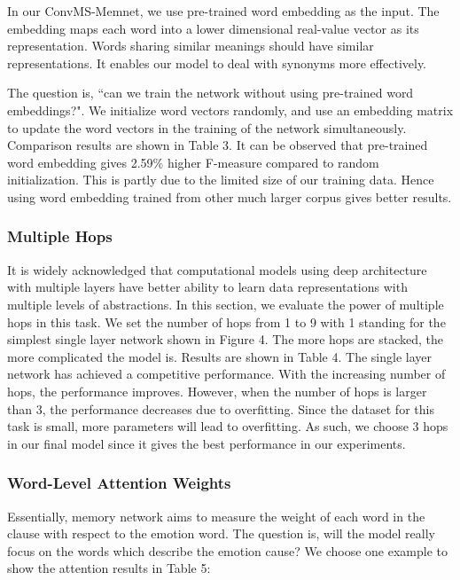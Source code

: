 \documentclass[11pt,letterpaper]{article}
\begin{document}
\begin{CJK*}{UTF8}{gbsn}
In our ConvMS-Memnet, we use pre-trained word embedding as the input. The embedding maps each word into a lower dimensional real-value vector as its representation. Words sharing similar meanings should have similar representations. It enables our model to deal with synonyms more effectively. 

The question is, ``can we train the network without using pre-trained word embeddings?". We initialize word vectors randomly, and use an embedding matrix to update the word vectors in the training of the network simultaneously. Comparison results are shown in Table 3. It can be observed that pre-trained word embedding gives 2.59\% higher F-measure compared to random initialization. This is partly due to the limited size of our training data. Hence using word embedding trained from other much larger corpus gives better results.



\subsubsection{Multiple Hops}
\label{sec:multihops}

It is widely acknowledged that computational models using deep architecture with multiple layers have better ability to learn data representations with multiple levels of abstractions. In this section, we evaluate the power of multiple hops in this task. We set the number of hops from 1 to 9 with 1 standing for the simplest single layer network shown in Figure 4. The more hops are stacked, the more complicated the model is. Results are shown in Table 4.
The single layer network has achieved a competitive performance. With the increasing number of hops, the performance improves. However, when the number of hops is larger than 3, the performance decreases due to overfitting. Since the dataset for this task is small, more parameters will lead to overfitting. As such, we choose 3 hops in our final model since it gives the best performance in our experiments.

\subsubsection{Word-Level Attention Weights}

Essentially, memory network aims to measure the weight of each word in the clause with respect to the emotion word. The question is, will the model really focus on the words which describe the emotion cause? We choose one example to show the attention results in Table 5:


\end{CJK*}
\end{document}
